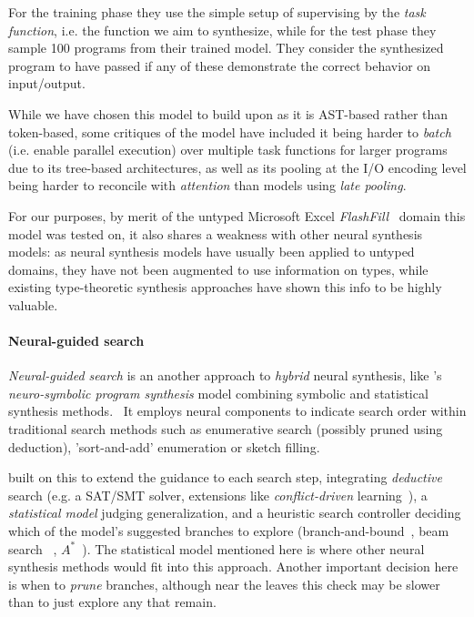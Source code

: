 \documentclass{article}
\begin{document}
For the training phase they use the simple setup of supervising by the \emph{task function},
i.e. the function we aim to synthesize,
while for the test phase they sample 100 programs from their trained model.
They consider the synthesized program to have passed if any of these demonstrate the correct behavior on input/output.


While we have chosen this model to build upon as it is AST-based rather than token-based,
some critiques of the model have included it being harder to \emph{batch} (i.e. enable parallel execution) over multiple task functions for larger programs due to its tree-based architectures,
as well as its pooling at the I/O encoding level being harder to reconcile with \emph{attention} than models using \emph{late pooling}.~\citep{devlin2017robustfill}

For our purposes, by merit of the untyped Microsoft Excel \emph{FlashFill}~\citep{prose} domain this model was tested on,
it also shares a weakness with other neural synthesis models:
as neural synthesis models have usually been applied to untyped domains,
they have not been augmented to use information on types,
while existing type-theoretic synthesis approaches have shown this info to be highly valuable.

\paragraph{Neural-guided search} \label{sec:ngs}

\emph{Neural-guided search} is an another approach to \emph{hybrid} neural synthesis,
like \citet{nsps}'s \emph{neuro-symbolic program synthesis} model combining symbolic and statistical synthesis methods.~\citep{nps}
It employs neural components to indicate search order within traditional search methods
such as enumerative search (possibly pruned using deduction),
'sort-and-add' enumeration or sketch filling.~\citep{deepcoder}

\citet{kalyan2018neural} built on this to extend the guidance to each search step,
integrating \emph{deductive} search (e.g. a SAT/SMT solver, extensions
like \emph{conflict-driven} learning~\citep{feng2018program}),
a \emph{statistical model} judging generalization,
and a heuristic search controller deciding which of the model's suggested branches
to explore (branch-and-bound~\citep{kalyan2018neural}, beam search%
~\citep{polosukhin2018neural}, $A^{*}$~\citep{lee2018accelerating}).
The statistical model mentioned here is where other
neural synthesis methods would fit into this approach.
Another important decision here is when to \emph{prune} branches,
although near the leaves this check may be slower
than to just explore any that remain.~\citep{polozov}
\end{document}
